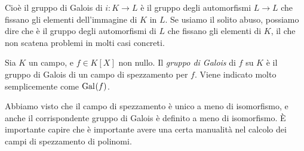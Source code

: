 Cioè il gruppo di Galois di $i : K \to L$ è il gruppo degli automorfismi $L \to L$ che fissano gli elementi dell'immagine di $K$ in $L$. Se usiamo il solito abuso, possiamo dire che è il gruppo degli automorfismi di $L$ che fissano gli elementi di $K$, il che non scatena problemi in molti casi concreti.

\begin{defi}
Sia $K$ un campo, e $f \in K[X]$ non nullo. Il {\em gruppo di Galois} di $f$ su $K$ è il gruppo di Galois di un campo di spezzamento per $f$. Viene indicato molto semplicemente come $\operatorname{Gal}_{}\!\left(f\right)$.
\end{defi}

Abbiamo visto che il campo di spezzamento è unico a meno di isomorfismo, e anche il corrispondente gruppo di Galois è definito a meno di isomorfismo. È importante capire che è importante avere una certa manualità nel calcolo dei campi di spezzamento di polinomi.

%
% 
%
%
%


